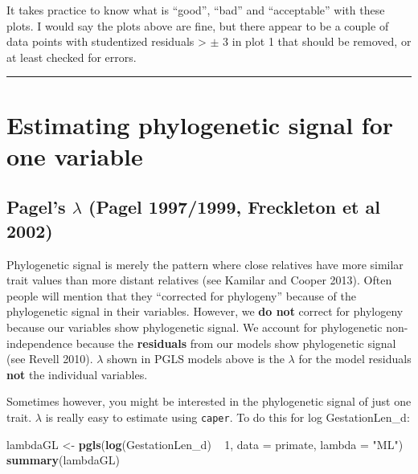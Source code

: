 \documentclass[]{book}
\newenvironment{Shaded}{\begin{snugshade}}{\end{snugshade}}
\newcommand{\KeywordTok}[1]{\textcolor[rgb]{0.13,0.29,0.53}{\textbf{{#1}}}}
\newcommand{\DataTypeTok}[1]{\textcolor[rgb]{0.13,0.29,0.53}{{#1}}}
\newcommand{\DecValTok}[1]{\textcolor[rgb]{0.00,0.00,0.81}{{#1}}}
\newcommand{\StringTok}[1]{\textcolor[rgb]{0.31,0.60,0.02}{{#1}}}
\newcommand{\NormalTok}[1]{{#1}}
\theoremstyle{definition}
\theoremstyle{definition}
\theoremstyle{definition}
\theoremstyle{remark}
\begin{document}
It takes practice to know what is ``good'', ``bad'' and ``acceptable''
with these plots. I would say the plots above are fine, but there appear
to be a couple of data points with studentized residuals \textgreater{}
\(\pm\) 3 in plot 1 that should be removed, or at least checked for
errors.

\begin{center}\rule{0.5\linewidth}{\linethickness}\end{center}

\section{Estimating phylogenetic signal for one
variable}\label{estimating-phylogenetic-signal-for-one-variable}

\subsection{\texorpdfstring{Pagel's \(\lambda\) (Pagel 1997/1999,
Freckleton et al
2002)}{Pagel's \textbackslash{}lambda (Pagel 1997/1999, Freckleton et al 2002)}}\label{pagels-lambda-pagel-19971999-freckleton-et-al-2002}

Phylogenetic signal is merely the pattern where close relatives have
more similar trait values than more distant relatives (see Kamilar and
Cooper 2013). Often people will mention that they ``corrected for
phylogeny'' because of the phylogenetic signal in their variables.
However, we \textbf{do not} correct for phylogeny because our variables
show phylogenetic signal. We account for phylogenetic non-independence
because the \textbf{residuals} from our models show phylogenetic signal
(see Revell 2010). \(\lambda\) shown in PGLS models above is the
\(\lambda\) for the model residuals \textbf{not} the individual
variables.

Sometimes however, you might be interested in the phylogenetic signal of
just one trait. \(\lambda\) is really easy to estimate using
\texttt{caper}. To do this for log GestationLen\_d:

\begin{Shaded}
\begin{Highlighting}[]
\NormalTok{lambdaGL <-}\StringTok{ }\KeywordTok{pgls}\NormalTok{(}\KeywordTok{log}\NormalTok{(GestationLen_d) ~}\StringTok{ }\DecValTok{1}\NormalTok{, }\DataTypeTok{data =} \NormalTok{primate, }\DataTypeTok{lambda =} \StringTok{"ML"}\NormalTok{)}
\KeywordTok{summary}\NormalTok{(lambdaGL)}
\end{Highlighting}
\end{Shaded}
\end{document}
